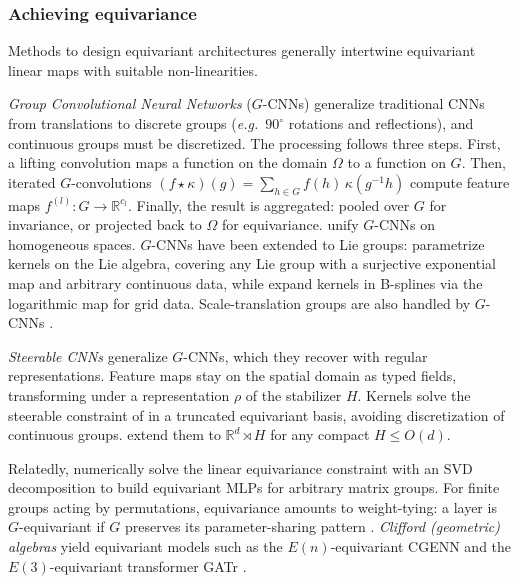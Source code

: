 \documentclass[mathematics,review,submit,moreauthors]{Definitions/mdpi}
\begin{document}
\subsubsection{Achieving equivariance}\label{sec:edl-achieving-equiv}

Methods to design equivariant architectures generally intertwine equivariant linear maps with suitable non-linearities.

\emph{Group Convolutional Neural Networks} ($G$-CNNs) \citep{cohen2016} generalize traditional CNNs from translations to discrete groups (\textit{e.g.}\ $90^\circ$ rotations and reflections), and continuous groups must be discretized.
The processing follows three steps.
First, a lifting convolution maps a function on the domain $\Omega$ to a function on $G$.
Then, iterated $G$-convolutions $(f\star\kappa)(g)=\sum_{h\in G}f(h)\,\kappa(g^{-1}h)$ compute feature maps $f^{(l)}:G\to\mathbb{R}^{c_l}$.
Finally, the result is aggregated: pooled over $G$ for invariance, or projected back to $\Omega$ for equivariance.
\citet{cohen2019anips} unify $G$-CNNs on homogeneous spaces.
$G$-CNNs have been extended to Lie groups: \citet{finzi2020p3icml} parametrize kernels on the Lie algebra, covering any Lie group with a surjective exponential map and arbitrary continuous data, while \citet{bekkers2021} expand kernels in B-splines via the logarithmic map for grid data.
Scale-translation groups are also handled by $G$-CNNs \citep{sosnovik2020,romero2023tmlr}.

\emph{Steerable CNNs} \citep{cohen2016a} generalize $G$-CNNs, which they recover with regular representations.
Feature maps stay on the spatial domain as typed fields, transforming under a representation $\rho$ of the stabilizer $H$.
Kernels solve the steerable constraint of  in a truncated equivariant basis, avoiding discretization of continuous groups.
\citet{cesa2021} extend them to $\mathbb{R}^d\rtimes H$ for any compact $H\le O(d)$.

Relatedly, \citet{finzi2021p3icml} numerically solve the linear equivariance constraint with an SVD decomposition to build equivariant MLPs for arbitrary matrix groups.
For finite groups acting by permutations, equivariance amounts to weight-tying: a layer is $G$-equivariant if $G$ preserves its parameter-sharing pattern \citep{ravanbakhsh2017p3icml}.
\emph{Clifford (geometric) algebras} yield equivariant models such as the $E(n)$-equivariant CGENN \citep{ruhe2023} and the $E(3)$-equivariant transformer GATr \citep{brehmer2023}.
\end{document}
